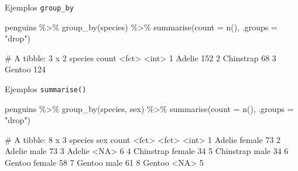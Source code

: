 \documentclass[
  ignorenonframetext,
  aspectratio=169]{beamer}
\newenvironment{Shaded}{\begin{snugshade}}{\end{snugshade}}
\newcommand{\AttributeTok}[1]{\textcolor[rgb]{0.77,0.63,0.00}{#1}}
\newcommand{\FunctionTok}[1]{\textcolor[rgb]{0.00,0.00,0.00}{#1}}
\newcommand{\NormalTok}[1]{#1}
\newcommand{\SpecialCharTok}[1]{\textcolor[rgb]{0.00,0.00,0.00}{#1}}
\newcommand{\StringTok}[1]{\textcolor[rgb]{0.31,0.60,0.02}{#1}}
\let\oldverbatim\verbatim
\let\endoldverbatim\endverbatim
\renewenvironment{verbatim}{\tiny\oldverbatim}{\endoldverbatim}
\begin{document}
\begin{frame}[fragile]{Ejemplos \texttt{group\_by}}
\protect\hypertarget{ejemplos-group_by-2}{}
\begin{Shaded}
\begin{Highlighting}[]
\NormalTok{penguins }\SpecialCharTok{\%\textgreater{}\%} \FunctionTok{group\_by}\NormalTok{(species) }\SpecialCharTok{\%\textgreater{}\%} 
  \FunctionTok{summarise}\NormalTok{(}\AttributeTok{count =} \FunctionTok{n}\NormalTok{(), }\AttributeTok{.groups =} \StringTok{"drop"}\NormalTok{)}
\end{Highlighting}
\end{Shaded}

\begin{verbatim}
# A tibble: 3 x 2
  species   count
  <fct>     <int>
1 Adelie      152
2 Chinstrap    68
3 Gentoo      124
\end{verbatim}
\end{frame}

\begin{frame}[fragile]{Ejemplos \texttt{summarise()}}
\protect\hypertarget{ejemplos-summarise}{}
\begin{Shaded}
\begin{Highlighting}[]
\NormalTok{penguins }\SpecialCharTok{\%\textgreater{}\%} \FunctionTok{group\_by}\NormalTok{(species, sex) }\SpecialCharTok{\%\textgreater{}\%} \FunctionTok{summarise}\NormalTok{(}\AttributeTok{count =} \FunctionTok{n}\NormalTok{(), }\AttributeTok{.groups =} \StringTok{"drop"}\NormalTok{)}
\end{Highlighting}
\end{Shaded}

\begin{verbatim}
# A tibble: 8 x 3
  species   sex    count
  <fct>     <fct>  <int>
1 Adelie    female    73
2 Adelie    male      73
3 Adelie    <NA>       6
4 Chinstrap female    34
5 Chinstrap male      34
6 Gentoo    female    58
7 Gentoo    male      61
8 Gentoo    <NA>       5
\end{verbatim}
\end{frame}
\end{document}
